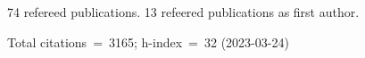 74 refereed publications. 13 refeered publications as first author.

Total citations~=~3165; h-index~=~32 (2023-03-24)